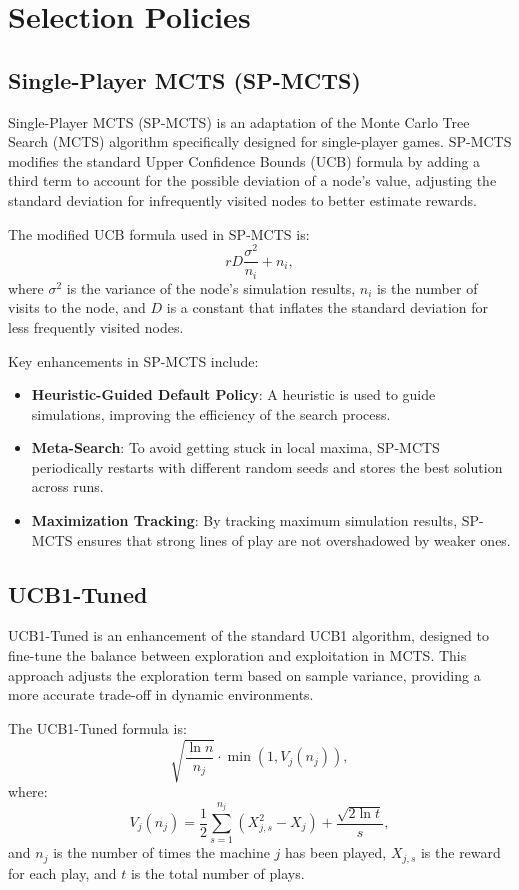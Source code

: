 \section{Selection Policies}
\label{sub:selection_policies_litterature}
\subsection{Single-Player MCTS (SP-MCTS)}
Single-Player MCTS (SP-MCTS) is an adaptation of the Monte Carlo Tree Search (MCTS) algorithm specifically designed for single-player games. SP-MCTS modifies the standard Upper Confidence Bounds (UCB) formula by adding a third term to account for the possible deviation of a node's value, adjusting the standard deviation for infrequently visited nodes to better estimate rewards.

The modified UCB formula used in SP-MCTS is:
\begin{equation}
    rD \frac{\sigma^2}{n_i} + n_i,
\end{equation}
where \( \sigma^2 \) is the variance of the node's simulation results, \( n_i \) is the number of visits to the node, and \( D \) is a constant that inflates the standard deviation for less frequently visited nodes.

Key enhancements in SP-MCTS include:
\begin{itemize}
    \item \textbf{Heuristic-Guided Default Policy}: A heuristic is used to guide simulations, improving the efficiency of the search process.
    \item \textbf{Meta-Search}: To avoid getting stuck in local maxima, SP-MCTS periodically restarts with different random seeds and stores the best solution across runs.
    \item \textbf{Maximization Tracking}: By tracking maximum simulation results, SP-MCTS ensures that strong lines of play are not overshadowed by weaker ones.
\end{itemize}

\subsection{UCB1-Tuned}
UCB1-Tuned is an enhancement of the standard UCB1 algorithm, designed to fine-tune the balance between exploration and exploitation in MCTS. This approach adjusts the exploration term based on sample variance, providing a more accurate trade-off in dynamic environments.

The UCB1-Tuned formula is:
\begin{equation}
    \sqrt{\frac{\ln n}{n_j}} \cdot \min\left(1, V_j(n_j)\right),
\end{equation}
where:
\begin{equation}
    V_j(n_j) = \frac{1}{2} \sum_{s=1}^{n_j} \left(X_{j,s}^2 - X_j\right) + \frac{\sqrt{2 \ln t}}{s},
\end{equation}
and \( n_j \) is the number of times the machine \( j \) has been played, \( X_{j,s} \) is the reward for each play, and \( t \) is the total number of plays.

